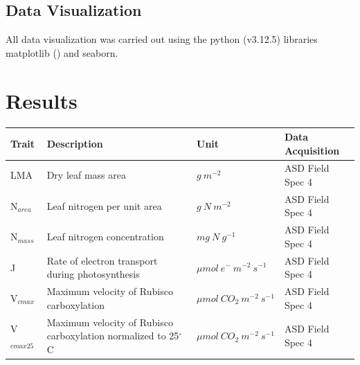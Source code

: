 \documentclass{article}
\begin{document}
\subsection{Data Visualization}
All data visualization was carried out using the python (v3.12.5) libraries matplotlib (\cite{hunter_matplotlib_2007})
and seaborn.

\section{Results}

\begin{table}[ht]
	\begin{adjustbox}
		{width=\textwidth}
		\begin{tabular}{@{}llll@{}}
			\toprule
			\textbf{Trait}          & \textbf{Description}                                                                       & \textbf{Unit}                                & \textbf{Data Acquisition}                            \\ \midrule
			LMA                     & Dry leaf mass area                                                                         & ${g \ m^{-2}}$                               & ASD Field Spec 4                                     \\
			N$_{area}$              & Leaf nitrogen per unit area                                                                & ${g \ N \ m^{-2}}$                           & ASD Field Spec 4                                     \\
			N$_{mass}$              & Leaf nitrogen concentration                                                                & ${mg \ N \ g^{-1}}$                          & ASD Field Spec 4                                     \\
			J                       & Rate of electron transport during photosynthesis                                           & ${\mu mol \ e^{-} \ m^{-2} \ s^{-1}}$        & ASD Field Spec 4                                     \\
			V$_{cmax}$              & Maximum velocity of Rubisco carboxylation                                                  & ${\mu mol \ CO_{2} \ m^{-2} \ s^{-1}}$       & ASD Field Spec 4                                     \\
			V$_{cmax25}$            & Maximum velocity of Rubisco carboxylation normalized to 25$^{\circ}$C                      & ${\mu mol \ CO_{2} \ m^{-2} \ s^{-1}}$       & ASD Field Spec 4                                     \\

\end{tabular}
\end{adjustbox}
\end{table}
\end{document}

